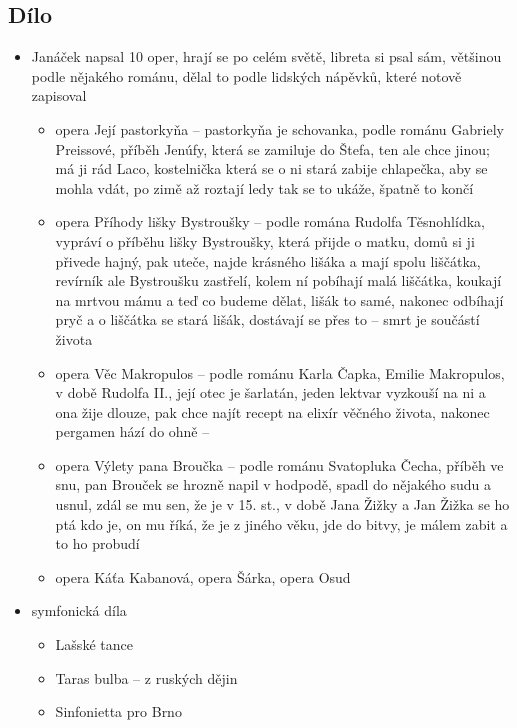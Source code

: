 \documentclass{article}
\begin{document}
\subsection{Dílo}
\begin{itemize}
  \item Janáček napsal 10 oper, hrají se po celém světě, libreta si psal sám, většinou podle nějakého románu, dělal to podle lidských nápěvků, které notově zapisoval
  \begin{itemize}
    \item opera Její pastorkyňa -- pastorkyňa je schovanka, podle románu Gabriely Preissové, příběh Jenúfy, která se zamiluje do Štefa, ten ale chce jinou; má ji rád Laco, kostelnička která se o ni stará zabije chlapečka, aby se mohla vdát, po zimě až roztají ledy tak se to ukáže, špatně to končí
    \item opera Příhody lišky Bystroušky -- podle romána Rudolfa Těsnohlídka, vypráví o příběhu lišky Bystroušky, která přijde o matku, domů si ji přivede hajný, pak uteče, najde krásného lišáka a mají spolu liščátka, revírník ale Bystroušku zastřelí, kolem ní pobíhají malá liščátka, koukají na mrtvou mámu a teď co budeme dělat, lišák to samé, nakonec odbíhají pryč a o liščátka se stará lišák, dostávají se přes to -- smrt je součástí života
    \item opera Věc Makropulos -- podle románu Karla Čapka, Emilie Makropulos, v době Rudolfa II., její otec je šarlatán, jeden lektvar vyzkouší na ni a ona žije dlouze, pak chce najít recept na elixír věčného života, nakonec pergamen hází do ohně -- 
    \item opera Výlety pana Broučka -- podle románu Svatopluka Čecha, příběh ve snu, pan Brouček se hrozně napil v hodpodě, spadl do nějakého sudu a usnul, zdál se mu sen, že je v 15. st., v době Jana Žižky a Jan Žižka se ho ptá kdo je, on mu říká, že je z jiného věku, jde do bitvy, je málem zabit a to ho probudí
    \item opera Káťa Kabanová, opera Šárka, opera Osud
  \end{itemize}
  \item symfonická díla
  \begin{itemize}
    \item Lašské tance
    \item Taras bulba -- z ruských dějin
    \item Sinfonietta pro Brno
  \end{itemize}

\end{itemize}
\end{document}
